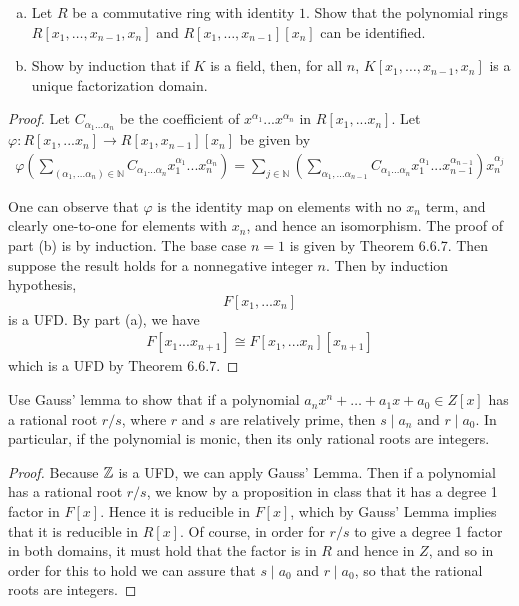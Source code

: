\documentclass[num=1,duedate=02-03-21,course=Algebra\ II,proflastname=Walton]{hwtemplate}
\begin{document}
\problem[3]
\begin{claim}
	\begin{enumerate}[(a).]
		\item Let \(R\) be a commutative ring with identity \(1\). Show that the polynomial rings \(R[x_1, \ldots,x_{n-1},x_n]\) and \(R[x_1,\ldots,x_{n-1}][x_n]\) can be identified.
		\item Show by induction that if \(K\) is a field, then, for all \(n\), \(K[x_1,\ldots,x_{n-1},x_n]\) is a unique factorization domain.
	\end{enumerate}
\end{claim}
\begin{proof}
Let $C_{\alpha_1...\alpha_n}$ be the coefficient of $x^{\alpha_1}...x^{\alpha_n}$ in $R[x_1, ... x_n]$. Let $\varphi:R[x_1, ... x_n] \rightarrow R[x_1, x_{n-1}][x_n]$ be given by
\begin{align}
\varphi \left( \sum_{(\alpha_1, ... \alpha_n) \in \mathbb{N}}C_{\alpha_1...\alpha_n}x_1^{\alpha_1}...x_n^{\alpha_n}\right) = \sum_{j\in \mathbb{N}}\left( \sum_{\alpha_1, ... \alpha_{n-1}}C_{\alpha_1...\alpha_n}x_1^{\alpha_1}...x_{n-1}^{\alpha_{n-1}}  \right)x_n^{\alpha_j}
\end{align}

One can observe that $\varphi$ is the identity map on elements with no \(x_n\) term, and clearly one-to-one for elements with \(x_n\), and hence an isomorphism. The proof of part (b) is by induction. The base case $n=1$ is given by Theorem 6.6.7. Then suppose the result holds for a nonnegative integer $n$. Then by induction hypothesis,
$$F[x_1, ... x_n]$$
is a UFD. By part (a), we have
\begin{align}
    F[x_1 ... x_{n+1}] \cong F[x_1, ... x_n][x_{n+1}]
\end{align}
which is a UFD by Theorem 6.6.7.
\end{proof}
\separator

\problem[4]
\begin{claim}
	Use Gauss' lemma to show that if a polynomial \(a_nx^{n}+ \ldots + a_1x + a_0 \in Z[x]\) has a rational root \(r / s\), where \(r\) and \(s\) are relatively prime, then \(s\mid a_n\) and \(r\mid a_0\). In particular, if the polynomial is monic, then its only rational roots are integers.
\end{claim}
\begin{proof}
	
		Because \(\mathbb{Z}\) is a UFD, we can apply Gauss' Lemma. Then if a polynomial has a rational root \(r / s\), we know by a proposition in class that it has a degree 1 factor in \(F[x]\). Hence it is reducible in \(F[x]\), which by Gauss' Lemma implies that it is reducible in \(R[x]\). Of course, in order for \(r / s\) to give a degree 1 factor in both domains, it must hold that the factor is in \(R\) and hence in \(Z\), and so in order for this to hold we can assure that \(s\mid a_0\) and \(r\mid a_0\), so that the rational roots are integers.

\end{proof}
\end{document}
